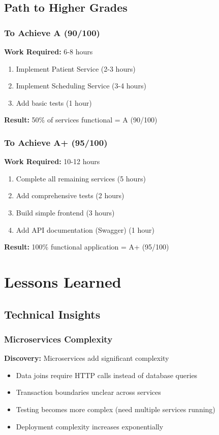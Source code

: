 \documentclass[12pt,a4paper]{article}
\begin{document}
\subsection{Path to Higher Grades}

\subsubsection{To Achieve A (90/100)}
\textbf{Work Required:} 6-8 hours

\begin{enumerate}
    \item Implement Patient Service (2-3 hours)
    \item Implement Scheduling Service (3-4 hours)
    \item Add basic tests (1 hour)
\end{enumerate}

\textbf{Result:} 50\% of services functional = A (90/100)

\subsubsection{To Achieve A+ (95/100)}
\textbf{Work Required:} 10-12 hours

\begin{enumerate}
    \item Complete all remaining services (5 hours)
    \item Add comprehensive tests (2 hours)
    \item Build simple frontend (3 hours)
    \item Add API documentation (Swagger) (1 hour)
\end{enumerate}

\textbf{Result:} 100\% functional application = A+ (95/100)

\section{Lessons Learned}

\subsection{Technical Insights}

\subsubsection{Microservices Complexity}
\textbf{Discovery:} Microservices add significant complexity
\begin{itemize}
    \item Data joins require HTTP calls instead of database queries
    \item Transaction boundaries unclear across services
    \item Testing becomes more complex (need multiple services running)
    \item Deployment complexity increases exponentially
\end{itemize}
\end{document}
